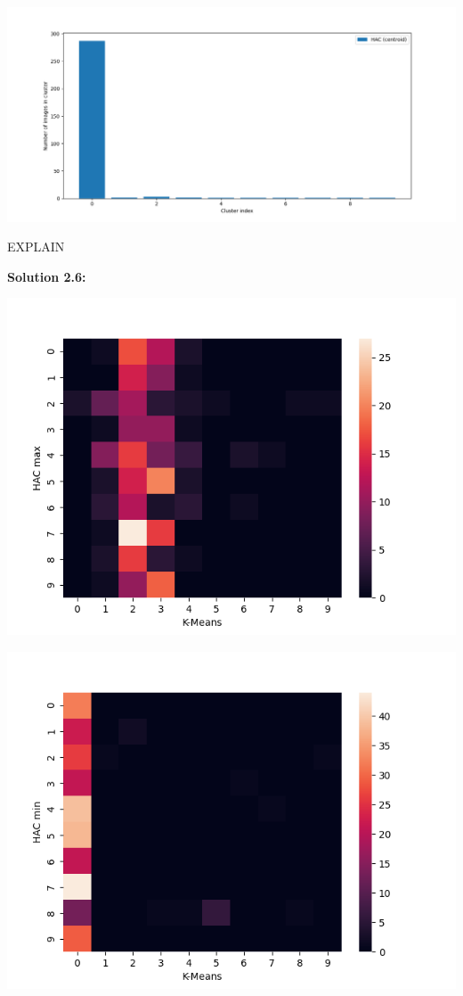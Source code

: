 \documentclass[submit]{harvardml}
\begin{document}
\begin{center}
    \includegraphics[scale=0.5]{HW4/2.5_haccentroid.png}
\end{center}
EXPLAIN

\noindent\textbf{Solution 2.6:}\\
\begin{center}
    \includegraphics[scale=0.5]{HW4/2.6.1.png}
\end{center}
\begin{center}
    \includegraphics[scale=0.5]{HW4/2.6.2.png}
\end{center}
\end{document}
